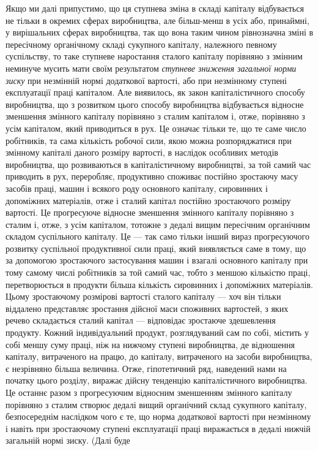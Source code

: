 Якщо ми далі припустимо, що ця ступнева зміна в складі
капіталу відбувається не тільки в окремих сферах виробництва,
але більш-менш в усіх або, принаймні, у вирішальних сферах
виробництва, так що вона таким чином рівнозначна зміні в пересічному
органічному складі сукупного капіталу, належного певному
суспільству, то таке ступневе наростання сталого капіталу
порівняно з змінним неминуче мусить мати своїм результатом
\emph{ступневе зниження загальної норми зиску} при незмінній нормі
додаткової вартості, або при незмінному ступені експлуатації
праці капіталом. Але виявилось, як закон капіталістичного способу
виробництва, що з розвитком цього способу виробництва
відбувається відносне зменшення змінного капіталу порівняно
з сталим капіталом і, отже, порівняно з усім капіталом, який
приводиться в рух. Це означає тільки те, що те саме число
робітників, та сама кількість робочої сили, якою можна розпоряджатися
при змінному капіталі даного розміру вартості, в наслідок
особливих методів виробництва, що розвиваються в капіталістичному
виробництві, за той самий час приводить в рух,
переробляє, продуктивно споживає постійно зростаючу масу
засобів праці, машин і всякого роду основного капіталу, сировинних
і допоміжних матеріалів, отже і сталий капітал постійно
зростаючого розміру вартості. Це прогресуюче відносне зменшення
змінного капіталу порівняно з сталим і, отже, з усім капіталом,
тотожне з дедалі вищим пересічним органічним складом
суспільного капіталу. Це — так само тільки інший вираз
прогресуючого розвитку суспільної продуктивної сили праці,
який виявляється саме в тому, що за допомогою зростаючого
застосування машин і взагалі основного капіталу при тому самому
числі робітників за той самий час, тобто з меншою кількістю
праці, перетворюється в продукти більша кількість сировинних
і допоміжних матеріалів. Цьому зростаючому розмірові вартості
сталого капіталу — хоч він тільки віддалено представляє зростання
дійсної маси споживних вартостей, з яких речево складається
сталий капітал — відповідає зростаюче здешевлення продукту.
Кожний індивідуальний продукт, розглядуваний сам по
собі, містить у собі меншу суму праці, ніж на нижчому ступені виробництва,
де відношення капіталу, витраченого на працю, до
капіталу, витраченого на засоби виробництва, є незрівняно
більша величина. Отже, гіпотетичний ряд, наведений нами на
початку цього розділу, виражає дійсну тенденцію капіталістичного
виробництва. Це останнє разом з прогресуючим відносним
зменшенням змінного капіталу порівняно з сталим створює дедалі
вищий органічний склад сукупного капіталу, безпосереднім
наслідком чого є те, що норма додаткової вартості при незмінному
і навіть при зростаючому ступені експлуатації праці
виражається в дедалі нижчій загальній нормі зиску. (Далі буде
\parbreak{}  %
